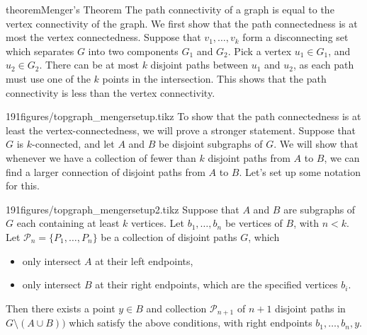 \begin{doubledpage}{theorem}{Menger's Theorem}{
	The path connectivity of a graph is equal to the vertex connectivity of the graph.  }
\label{graph:thm:mengers}
We first show that the path connectedness is at most the vertex connectedness. 
Suppose that  $v_1, \ldots, v_k$ form a disconnecting set which separates $G$ into two components $G_1$ and $G_2$.
Pick a vertex $u_1\in G_1$, and $u_2\in G_2$.
There can be at most $k$ disjoint paths between $u_1$ and $u_2$, as each path must use one of the $k$ points in the intersection.
This shows that the path connectivity is less than the vertex connectivity.
\begin{paragraphfigureenv}[Setup:]{191figures/topgraph_mengersetup.tikz} To show that the path connectedness is at least the vertex-connectedness, we will prove a stronger statement.  Suppose that $G$ is $k$-connected,  and let $A$ and $B$ be disjoint subgraphs of $G$.
We will show that whenever we have a collection of fewer than $k$ disjoint paths from $A$ to $B$, we can find a larger connection of disjoint paths from $A$ to $B$. Let's set up some notation for this. 
\end{paragraphfigureenv}
\begin{claimfigureenv}{191figures/topgraph_mengersetup2.tikz}
Suppose that $A$ and $B$ are subgraphs of $G$ each containing at least $k$ vertices.
Let $b_1, \ldots, b_n$ be vertices of $B$, with $n<k$. 
Let $\mathcal P_n=\{P_1, \ldots , P_n\}$ be a collection of disjoint paths $G$, which 
\begin{itemize}
    \item only intersect $A$ at their left endpoints,
    \item only intersect $B$ at their right endpoints, which are the specified vertices $b_i$. 
\end{itemize}
Then there exists a point $y\in B$ and  collection $\mathcal P_{n+1}$ of $n+1$ disjoint paths in  $G\setminus (A\cup B))$ which satisfy the above conditions, with right endpoints $b_1, \ldots, b_n, y$. 
\end{claimfigureenv}


\end{doubledpage}
